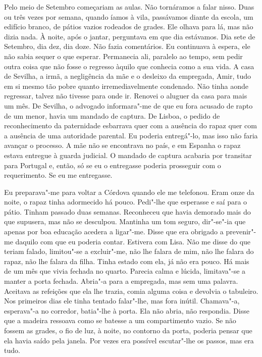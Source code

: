 Pelo meio de Setembro começariam as aulas. Não tornáramos a falar nisso.
Duas ou três vezes por semana, quando íamos à vila, passávamos diante da
escola, um edifício branco, de pátios vazios rodeados de grades. Ele
olhava para lá, mas não dizia nada. À noite, após o jantar, perguntava
em que dia estávamos. Dia sete de Setembro, dia dez, dia doze. Não fazia
comentários. Eu continuava à espera, ele não sabia sequer o que esperar.
Permanecia ali, paralelo ao tempo, sem pedir outra coisa que não fosse o
regresso àquilo que conhecia como a sua vida. A casa de Sevilha, a irmã,
a negligência da mãe e o desleixo da empregada, Amir, tudo em si mesmo
tão pobre quanto irremediavelmente condenado. Não tinha aonde regressar,
talvez não tivesse para onde ir. Renovei o aluguer da casa para mais um
mês. De Sevilha, o advogado informara"-me de que eu fora acusado de
rapto de um menor, havia um mandado de captura. De Lisboa, o pedido de
reconhecimento da paternidade esbarrava quer com a ausência do rapaz
quer com a ausência de uma autoridade parental. Eu poderia entregá"-lo,
mas isso não faria avançar o processo. A mãe não se encontrava no país,
e em Espanha o rapaz estava entregue à guarda judicial. O mandado de
captura acabaria por transitar para Portugal e, então, só se eu o
entregasse poderia prosseguir com o requerimento. Se eu me entregasse.

Eu preparava"-me para voltar a Córdova quando ele me telefonou. Eram
onze da noite, o rapaz tinha adormecido há pouco. Pedi"-lhe que
esperasse e saí para o pátio. Tinham passado duas semanas. Reconheceu
que havia demorado mais do que supusera, mas não se desculpou. Mantinha
um tom seguro, dir"-se"-ia que apenas por boa educação acedera a
ligar"-me. Disse que era obrigado a prevenir"-me daquilo com que eu
poderia contar. Estivera com Lisa. Não me disse do que teriam falado,
limitou"-se a excluir"-me, não lhe falara de mim, não lhe falara do
rapaz, não lhe falara da filha. Tinha estado com ela, já não era pouco.
Há mais de um mês que vivia fechada no quarto. Parecia calma e lúcida,
limitava"-se a manter a porta fechada. Abria"-a para a empregada, mas
sem uma palavra. Aceitava as refeições que ela lhe trazia, comia alguma
coisa e devolvia o tabuleiro. Nos primeiros dias ele tinha tentado
falar"-lhe, mas fora inútil. Chamava"-a, esperava"-a no corredor,
batia"-lhe à porta. Ela não abria, não respondia. Disse que a madeira
ressoava como se batesse a um compartimento vazio. Se não fossem as
grades, o fio de luz, à noite, no contorno da porta, poderia pensar que
ela havia saído pela janela. Por vezes era possível escutar"-lhe os
passos, mas era tudo.

